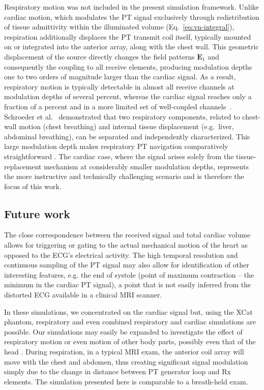\documentclass[
]{article}
\begin{document}
Respiratory motion was not included in the present simulation framework. Unlike cardiac motion, which modulates the PT signal exclusively through redistribution of tissue admittivity within the illuminated volume (Eq.~\ref{eq:vn-integral}), respiration additionally displaces the PT transmit coil itself, typically mounted on or integrated into the anterior array, along with the chest wall. This geometric displacement of the source directly changes the field patterns $\mathbf{E}_1$ and consequently the coupling to all receive elements, producing modulation depths one to two orders of magnitude larger than the cardiac signal. As a result, respiratory motion is typically detectable in almost all receive channels at modulation depths of several percent, whereas the cardiac signal reaches only a fraction of a percent and in a more limited set of well-coupled channels~\cite{Schroeder2016a}. Schroeder et al.\ \cite{Schroeder2016a} demonstrated that two respiratory components, related to chest-wall motion (chest breathing) and internal tissue displacement (e.g.\ liver, abdominal breathing), can be separated and independently characterized. This large modulation depth makes respiratory PT navigation comparatively straightforward \cite{Speier2015PT-Nav:MR-receiver, Vahle2020RespiratoryTone, Rigie2018TrackingNavigation, Lenk2018RespiratoryTechnology, Schroeder2016a}. The cardiac case, where the signal arises solely from the tissue-replacement mechanism at considerably smaller modulation depths, represents the more instructive and technically challenging scenario and is therefore the focus of this work.

\subsection{Future work}\label{future-work}

The close correspondence between the received signal and total cardiac volume allows for triggering or gating to the actual mechanical motion of the heart as opposed to the ECG's electrical activity. The high temporal resolution and continuous sampling of the PT signal may also allow for identification of other interesting features, e.g. the end of systole (point of maximum contraction -- the minimum in the cardiac PT signal), a point that is not easily inferred from the distorted ECG available in a clinical MRI scanner.

In these simulations, we concentrated on the cardiac signal but, using the XCat phantom, respiratory and even combined respiratory and cardiac simulations are possible. Our simulations may easily be expanded to investigate the effect of respiratory motion or even motion of other body parts, possibly even that of the head \cite{Speier2018SeparationMeasurements}. During respiration, in a typical MRI exam, the anterior coil array will move with the chest and abdomen, thus creating significant signal modulation simply due to the change in distance between PT generator loop and Rx elements. The simulation presented here is comparable to a breath-held exam.
\end{document}

